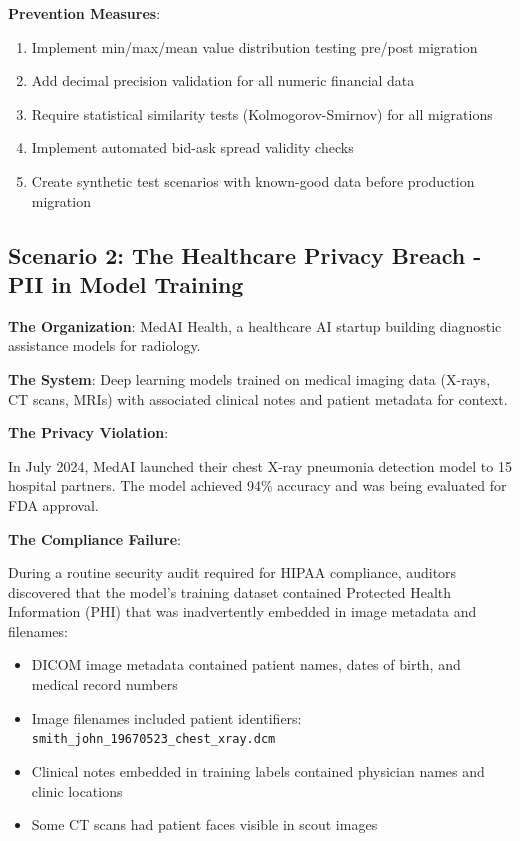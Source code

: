 \textbf{Prevention Measures}:
\begin{enumerate}
    \item Implement min/max/mean value distribution testing pre/post migration
    \item Add decimal precision validation for all numeric financial data
    \item Require statistical similarity tests (Kolmogorov-Smirnov) for all migrations
    \item Implement automated bid-ask spread validity checks
    \item Create synthetic test scenarios with known-good data before production migration
\end{enumerate}

\subsection{Scenario 2: The Healthcare Privacy Breach - PII in Model Training}

\textbf{The Organization}: MedAI Health, a healthcare AI startup building diagnostic assistance models for radiology.

\textbf{The System}: Deep learning models trained on medical imaging data (X-rays, CT scans, MRIs) with associated clinical notes and patient metadata for context.

\textbf{The Privacy Violation}:

In July 2024, MedAI launched their chest X-ray pneumonia detection model to 15 hospital partners. The model achieved 94\% accuracy and was being evaluated for FDA approval.

\textbf{The Compliance Failure}:

During a routine security audit required for HIPAA compliance, auditors discovered that the model's training dataset contained Protected Health Information (PHI) that was inadvertently embedded in image metadata and filenames:
\begin{itemize}
    \item DICOM image metadata contained patient names, dates of birth, and medical record numbers
    \item Image filenames included patient identifiers: \texttt{smith\_john\_19670523\_chest\_xray.dcm}
    \item Clinical notes embedded in training labels contained physician names and clinic locations
    \item Some CT scans had patient faces visible in scout images
\end{itemize}

